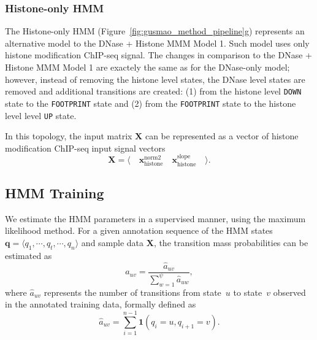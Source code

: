 \subsubsection{Histone-only HMM}

The Histone-only HMM (Figure~\ref{fig:gusmao_method_pipeline}g) represents an alternative model to the DNase + Histone MMM Model 1. Such model uses only histone modification ChIP-seq signal. The changes in comparison to the DNase + Histone MMM Model 1 are exactely the same as for the DNase-only model; however, instead of removing the histone level states, the DNase level states are removed and additional transitions are created: (1) from the histone level {\tt DOWN} state to the {\tt FOOTPRINT} state and (2) from the {\tt FOOTPRINT} state to the histone level level {\tt UP} state.

In this topology, the input matrix $\mathbf{X}$ can be represented as a vector of histone modification ChIP-seq input signal vectors
\begin{equation}
  \label{eq:signal.m5}
  \mathbf{X} = \langle \quad \mathbf{x}^{\text{norm2}}_{\text{histone}} \quad \mathbf{x}^{\text{slope}}_{\text{histone}} \quad \rangle .
\end{equation}

\subsection{HMM Training}
\label{sec:hmm.training}

We estimate the HMM parameters in a supervised manner, using the maximum likelihood method. For a given annotation sequence of the HMM states $\mathbf{q} = \langle q_1, \cdots, q_t, \cdots, q_n \rangle$ and sample data $\mathbf{X}$, the transition mass probabilities can be estimated as
\begin{equation}
  \label{eq:hmm.train.a.1}
  a_{uv} = \frac{ \hat{a}_{uv}}{ \sum_{w=1}^{\psi} \hat{a}_{uw}},
\end{equation}
where $ \hat{a}_{uv} $ represents the number of transitions from state~$u$ to state~$v$ observed in the annotated training data, formally defined as
\begin{equation}
  \label{eq:hmm.train.a.2}
  \hat{a}_{uv} = \sum_{i=1}^{n-1} \mathbf{1} (q_i=u, q_{i+1}=v).
\end{equation}

